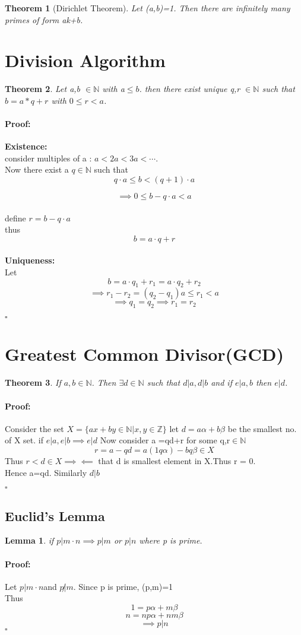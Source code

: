 \documentclass{report}
\newtheorem{lemma}{Lemma}[section]
\newtheorem{theorem}{Theorem}[section]
\newcommand{\n}{\mathbb{N}}
\newcommand{\z}{\mathbb{Z}}
\renewenvironment{proof}{\paragraph{Proof:}}{\hfill$\square$}
\begin{document}
\begin{theorem}[Dirichlet Theorem]
    Let (a,b)=1. Then there are infinitely many primes of form ak+b.
\end{theorem}
\section{Division Algorithm}
\begin{theorem}
    Let a,b $\in \n$ with a$\leq b$. then there exist unique q,r $\in \n$ such that $b = a*q+r$ with $0\leq r<a$.
\end{theorem}
\begin{proof}
    
 \textbf{Existence:}\\
consider multiples of a : $a<2a<3a<\cdots$.\\
Now there exist a $q\in \n$ such that $$q\cdot a \leq b< (q+1)\cdot a$$


$$\implies 0\leq b-q\cdot a < a$$
\\ define $r=b-q\cdot a$
\\
thus $$ b = a \cdot q +r$$
\\ \textbf{Uniqueness:}\\
Let $$b=a \cdot q_1+r_1 = a\cdot q_2 +r_2$$
$$\implies r_1-r_2 = (q_2-q_1)a \leq r_1<a$$
$$\implies q_1= q_2 \implies r_1=r_2$$

\end{proof}
\section{Greatest Common Divisor(GCD)}
\begin{theorem}
    If $a,b \in \n$. Then $\exists d \in \n$ such that $d|a, d|b$ and if $e|a,b$ then $e|d$.
\end{theorem}
\begin{proof}
    Consider the set $X=\{ax+by\in \n|x,y\in \z\}$
    let $d=a\alpha+b\beta$ be the smallest no. of X set. if $e|a,e|b \implies e|d$
    Now consider a =qd+r for some q,r$\in \n$
    \\
$$r=a-qd= a(1q\alpha)-bq\beta \in X$$
Thus $r<d \in X  \implies\impliedby$ that d is smallest element in X.Thus r = 0. \\
Hence a=qd. Similarly $d|b$

\end{proof}

\subsection{Euclid's Lemma}
\begin{lemma}
    if $p|m\cdot n \implies p|m$ or $p|n$ where p is prime.
\end{lemma}
\begin{proof}
    Let $p|m\cdot n$and $p\not| m$.
    Since p is prime, (p,m)=1
    \\
    Thus $$1=p\alpha+m\beta$$
    $$n=np\alpha+nm\beta$$
    $$\implies p|n$$
\end{proof}
\end{document}
